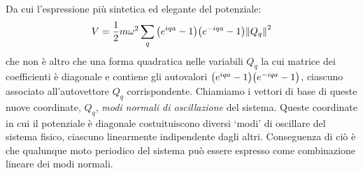         Da cui l'espressione pi\`u sintetica ed elegante del potenziale:
        \begin{equation}
            V=\frac{1}{2}m\omega^2\sum_q\qty(e^{iqa}-1)\qty(e^{-iqa}-1)\norm{Q_q}^2
        \end{equation}
        che non \`e altro che una forma quadratica nelle variabili $Q_q$ la cui matrice dei coefficienti \`e diagonale e contiene gli autovalori $\qty(e^{iqa}-1)\qty(e^{-iqa}-1)$, ciascuno associato all'autovettore $Q_q$ corrispondente. Chiamiamo i vettori di base di queste nuove coordinate, $Q_q$, \emph{modi normali di oscillazione} del sistema. Queste coordinate in cui il potenziale \`e diagonale costuituiscono diversi `modi' di oscillare del sistema fisico, ciascuno linearmente indipendente dagli altri. Conseguenza di ci\`o \`e che qualunque moto periodico del sistema pu\`o essere espresso come combinazione lineare dei modi normali.
